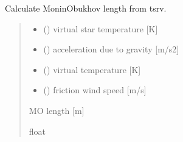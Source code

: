 \documentclass[letterpaper,10pt,english]{sphinxmanual}
\begin{document}

\begin{fulllineitems}
\label{\detokenize{users_guide:AirSeaFluxCode.flux_subs.get_Ltsrv}}
\pysigstartsignatures
\pysiglinewithargsret
{}
{\sphinxparamcomma {}\sphinxparamcomma {}\sphinxparamcomma {}}
{}
\pysigstopsignatures
\sphinxAtStartPar
Calculate Monin\sphinxhyphen{}Obukhov length from tsrv.
\begin{quote}\begin{description}
\begin{itemize}
\item {}
\sphinxAtStartPar
{} () \textendash{} virtual star temperature {[}K{]}

\item {}
\sphinxAtStartPar
{} () \textendash{} acceleration due to gravity {[}m/s2{]}

\item {}
\sphinxAtStartPar
{} () \textendash{} virtual temperature {[}K{]}

\item {}
\sphinxAtStartPar
{} () \textendash{} friction wind speed {[}m/s{]}

\end{itemize}

\sphinxAtStartPar
{} \textendash{} M\sphinxhyphen{}O length {[}m{]}

\sphinxAtStartPar
float

\end{description}\end{quote}

\end{fulllineitems}

\end{document}
